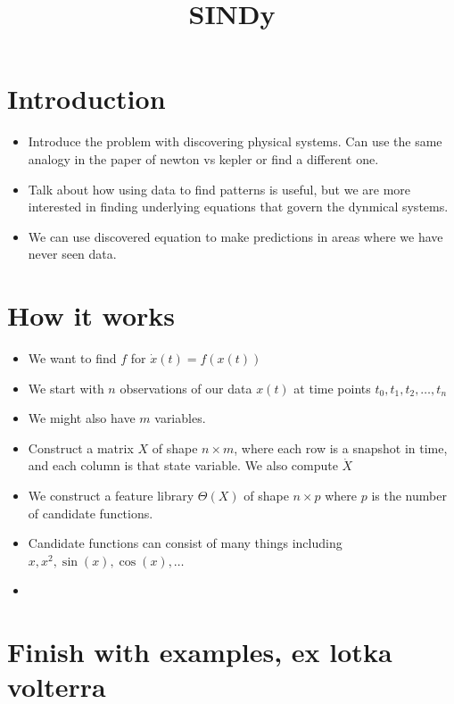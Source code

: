 \documentclass[11pt]{article}
\title{SINDy}
\begin{document}
    \section{Introduction}
        \begin{itemize}
            \item Introduce the problem with discovering physical systems. Can use the same analogy in the
            paper of newton vs kepler or find a different one.
            \item Talk about how using data to find patterns is useful, but we are more interested in finding
            underlying equations that govern the dynmical systems.
            \item We can use discovered equation to make
            predictions in areas where we have never seen data.
        \end{itemize}

    \section{How it works}
    \begin{itemize}
        \item We want to find $f$ for $\dot{x}(t) = f(x(t))$
        \item We start with $n$ observations of our data $x(t)$ at time points $t_0, t_1, t_2,\dots,t_n$
        \item We might also have $m$ variables.
        \item Construct a matrix $X$ of shape $n \times m$, where each row is a snapshot in time, and each
        column is that state variable. We also compute $\dot{X}$
        \item We construct a feature library $\Theta(X)$ of shape $n \times p$ where $p$ is the number of
        candidate functions.
        \item Candidate functions can consist of many things including $x, x^2, \sin(x), \cos(x),\dots$
        \item 
    \end{itemize}
    \section{Finish with examples, ex lotka volterra}
\end{document}
